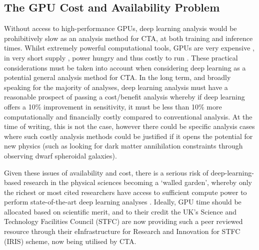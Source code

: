 \subsection{The GPU Cost and Availability Problem}
Without access to high-performance GPUs, deep learning analysis would be prohibitively slow as an analysis method for CTA, at both training and inference times. Whilst extremely powerful computational tools, GPUs are very expensive \cite{gpucost}, in very short supply \cite{gpushort}, power hungry \cite{2080ti} and thus costly to run \cite{2080ti}. These practical considerations must be taken into account when considering deep learning as a potential general analysis method for CTA. In the long term, and broadly speaking for the majority of analyses, deep learning analysis must have a reasonable prospect of passing a cost/benefit analysis whereby if deep learning offers a 10\% improvement in sensitivity, it must be less than 10\% more computationally and financially costly compared to conventional analysis. At the time of writing, this is not the case, however there could be specific analysis cases where such costly analysis methods could be justified if it opens the potential for new physics (such as looking for dark matter annihilation constraints through observing dwarf spheroidal galaxies\cite{gloryduck}).

Given these issues of availability and cost, there is a serious risk of deep-learning-based research in the physical sciences becoming a `walled garden', whereby only the richest or most cited researchers have access to sufficient compute power to perform state-of-the-art deep learning analyses \cite{gpudivide}. Ideally, GPU time should be allocated based on scientific merit, and to their credit the UK's Science and Technology Facilities Council (STFC) are now providing such a peer reviewed resource through their eInfrastructure for Research and Innovation for STFC (IRIS) scheme, now being utilised by CTA.
